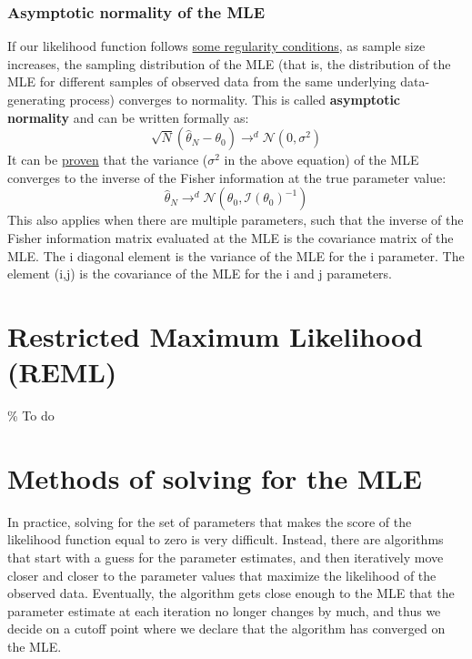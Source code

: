 \documentclass[12pt]{article}
\begin{document}
\subsubsection{Asymptotic normality of the MLE}
If our likelihood function follows \href{https://en.wikipedia.org/wiki/Fisher_information#Regularity_conditions}{some regularity conditions}, as sample size increases, the sampling distribution of the MLE (that is, the distribution of the MLE for different samples of observed data from the same underlying data-generating process) converges to normality. This is called \textbf{asymptotic normality} and can be written formally as:
$$
\sqrt{N}
(\hat{\theta}_N - \theta_0)
\rightarrow^d
\mathcal{N}(0, \sigma^2)
$$
It can be \href{https://gregorygundersen.com/blog/2019/11/28/asymptotic-normality-mle/}{proven} that the variance ($\sigma^2$ in the above equation) of the MLE converges to the inverse of the Fisher information at the true parameter value:
$$
\hat{\theta}_N
\rightarrow^d
\mathcal{N}(\theta_0, \mathcal{I}(\theta_0)^{-1})
$$
This also applies when there are multiple parameters, such that the inverse of the Fisher information matrix evaluated at the MLE is the covariance matrix of the MLE.
The i diagonal element is the variance of the MLE for the i parameter.
The element (i,j) is the covariance of the MLE for the i and j parameters.

\section{Restricted Maximum Likelihood (REML)}
\% To do

\section{Methods of solving for the MLE}
In practice, solving for the set of parameters that makes the score of the likelihood function equal to zero is very difficult.
Instead, there are algorithms that start with a guess for the parameter estimates, and then iteratively move closer and closer to the parameter values that maximize the likelihood of the observed data.
Eventually, the algorithm gets close enough to the MLE that the parameter estimate at each iteration no longer changes by much, and thus we decide on a cutoff point where we declare that the algorithm has converged on the MLE.
\end{document}
